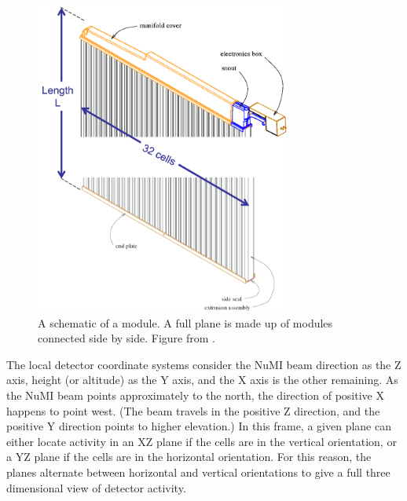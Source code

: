 \begin{figure}[htb]
  \centering
  \includegraphics[width=0.75\textwidth]{figures/DetModule.png}
  \caption[A Detector Module]{A schematic of a module. A full plane is made up of modules connected side by side. Figure from \cite{ref:TDRNOvA}.}
  \label{fig:DetModule}
\end{figure}

The local detector coordinate systems consider the NuMI beam direction as the Z axis, height (or altitude) as the Y axis, and the X axis is the other remaining. As the NuMI beam points approximately to the north, the direction of positive X happens to point west. (The beam travels in the positive Z direction, and the positive Y direction points to higher elevation.) In this frame, a given plane can either locate activity in an XZ plane if the cells are in the vertical orientation, or a YZ plane if the cells are in the horizontal orientation. For this reason, the planes alternate between horizontal and vertical orientations to give a full three dimensional view of detector activity.

